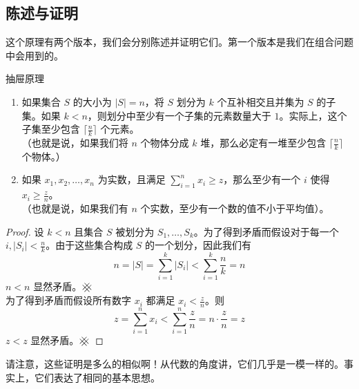 
\subsection{陈述与证明}

这个原理有两个版本，我们会分别陈述并证明它们。第一个版本是我们在组合问题中会用到的。

\begin{theorem}{抽屉原理}
    \begin{enumerate}[label=(\arabic*)]
        \item 如果集合 $S$ 的大小为 $|S| = n$，将 $S$ 划分为 $k$ 个互补相交且并集为 $S$ 的子集。如果 $k < n$，则划分中至少有一个子集的元素数量大于 $1$。实际上，这个子集至少包含 $\lceil \frac{n}{k} \rceil$ 个元素。\\
              （也就是说，如果我们将 $n$ 个物体分成 $k$ 堆，那么必定有一堆至少包含 $\lceil \frac{n}{k} \rceil$ 个物体。）
        \item 如果 $x_1, x_2, \dots , x_n$ 为实数，且满足 $\sum_{i=1}^{n} x_i \ge z$，那么至少有一个 $i$ 使得 $x_i \ge \frac{z}{n}$。\\
              （也就是说，如果我们有 $n$ 个实数，至少有一个数的值不小于平均值）。
    \end{enumerate}
\end{theorem}

\begin{proof}
    设 $k<n$ 且集合 $S$ 被划分为 $S_1,\dots, S_k$。为了得到矛盾而假设对于每一个 $i, |S_i| < \frac{n}{k}$。由于这些集合构成 $S$ 的一个划分，因此我们有
    \[n = |S| = \sum_{i=1}^{k}|S_i| < \sum_{i=1}^{k} \frac{n}{k}=n\]
    $n < n$ 显然矛盾。$\hashx$\\

    为了得到矛盾而假设所有数字 $x_i$ 都满足 $x_i < \frac{z}{n}$。则
    \[z = \sum_{i=1}^{n}x_i<\sum_{i=1}^{n}\frac{z}{n}=n \cdot \frac{z}{n}=z\]
    $z < z$ 显然矛盾。$\hashx$
\end{proof}

请注意，这些证明是多么的相似啊！从代数的角度讲，它们几乎是一模一样的。事实上，它们表达了相同的基本思想。